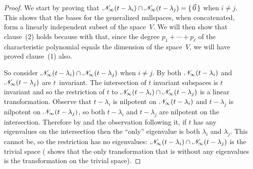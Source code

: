 \begin{proof}
We start by proving that
\( \mathscr{N}_\infty(t-\lambda_i)\cap\mathscr{N}_\infty(t-\lambda_j)=\mbox{$\{\,\vec{0}\,\}$} \)
when \( i\neq j \).
This shows that the bases for the generalized nullspaces, when concatenated,
form a linearly independent subset of the space~$V$.
We will then show that clause~(2) holds because with that, since
the degree \( p_1+\cdots+p_\ell \) of the
characteristic polynomial equals the dimension of the space~$V$,
we will have proved clause~(1) also.

So consider
\( \mathscr{N}_\infty(t-\lambda_i)\cap\mathscr{N}_\infty(t-\lambda_j) \)
when \( i\neq j \).
By 
both \( \mathscr{N}_\infty(t-\lambda_i) \) and 
\( \mathscr{N}_\infty(t-\lambda_j) \) are \( t \)~invariant.
The intersection of \( t \) invariant subspaces is \( t \)
invariant and so the restriction of \( t \) to
\( \mathscr{N}_\infty(t-\lambda_i)\cap\mathscr{N}_\infty(t-\lambda_j) \)
is a linear transformation.
Observe that 
$t-\lambda_i$ is nilpotent on \( \mathscr{N}_\infty(t-\lambda_i) \)
and  
$t-\lambda_j$ is nilpotent on \( \mathscr{N}_\infty(t-\lambda_j) \),
so both \( t-\lambda_i \) and \( t-\lambda_j \) are 
nilpotent on the intersection.
Therefore by  and the observation
following it, if \( t \) has any eigenvalues on the intersection 
then the ``only'' eigenvalue is both
\( \lambda_i \) and \( \lambda_j \).
This cannot be, so the restriction has no eigenvalues:
\( \mathscr{N}_\infty(t-\lambda_i)\cap\mathscr{N}_\infty(t-\lambda_j) \)
is the trivial space
( shows that 
the only transformation that is without any eigenvalues is 
the transformation on the trivial space).


\end{proof}
